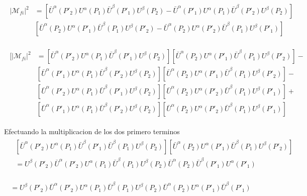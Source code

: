 \begin{gather}
\begin{split}
{|\mathcal{M}_{fi}|}^2&=[\bar{U}^{\alpha}({P'}_2){U}^{\alpha}({P}_1)\bar{U}^{\beta}({P'}_1){U}^{\beta}({P}_2)-\bar{U}^{\alpha}({P'}_1){U}^{\alpha}({P}_1)\bar{U}^{\beta}({P'}_2){U}^{\beta}({P}_2)]\\&[\bar{U}^{\alpha}({P}_2){U}^{\alpha}({P'}_1)\bar{U}^{\beta}({P}_1){U}^{\beta}({P'}_2)-\bar{U}^{\alpha}({P}_2){U}^{\alpha}({P'}_2)\bar{U}^{\beta}({P}_1){U}^{\beta}({P'}_1)]
\end{split}
\end{gather}

\begin{gather}
\begin{split}
[{|\mathcal{M}_{fi}|}^2&=[\bar{U}^{\alpha}({P'}_2){U}^{\alpha}({P}_1)\bar{U}^{\beta}({P'}_1){U}^{\beta}({P}_2)][\bar{U}^{\alpha}({P}_2){U}^{\alpha}({P'}_1)\bar{U}^{\beta}({P}_1){U}^{\beta}({P'}_2)]-\\&[\bar{U}^{\alpha}({P'}_1){U}^{\alpha}({P}_1)\bar{U}^{\beta}({P'}_2){U}^{\beta}({P}_2)][\bar{U}^{\alpha}({P}_2){U}^{\alpha}({P'}_1)\bar{U}^{\beta}({P}_1){U}^{\beta}({P'}_2)]-\\&[\bar{U}^{\alpha}({P'}_2){U}^{\alpha}({P}_1)\bar{U}^{\beta}({P'}_1){U}^{\beta}({P}_2)][\bar{U}^{\alpha}({P}_2){U}^{\alpha}({P'}_2)\bar{U}^{\beta}({P}_1){U}^{\beta}({P'}_1)]+\\&[\bar{U}^{\alpha}({P'}_1){U}^{\alpha}({P}_1)\bar{U}^{\beta}({P'}_2){U}^{\beta}({P}_2)][\bar{U}^{\alpha}({P}_2){U}^{\alpha}({P'}_2)\bar{U}^{\beta}({P}_1){U}^{\beta}({P'}_1)]
\end{split}
\end{gather}

Efectuando la multiplicacion de los dos primero terminos
\begin{gather}
\begin{split}
&[\bar{U}^{\alpha}({P'}_2){U}^{\alpha}({P}_1)\bar{U}^{\beta}({P'}_1)\bar{U}^{\beta}({P}_1){U}^{\beta}({P}_2)][\bar{U}^{\alpha}({P}_2){U}^{\alpha}({P'}_1)\bar{U}^{\beta}({P}_1){U}^{\beta}({P'}_2)]\\&={U}^{\beta}({P'}_2)\bar{U}^{\alpha}({P'}_2){U}^{\alpha}({P}_1)\bar{U}^{\beta}({P}_1){U}^{\beta}({P}_2)\bar{U}^{\alpha}({P}_2)\bar{U}^{\beta}({P'}_1){U}^{\alpha}({P'}_1)
\end{split}
\end{gather}

\begin{gather}
\begin{split}
={U}^{\beta}({P'}_2)\bar{U}^{\alpha}({P'}_2){U}^{\alpha}({P}_1)\bar{U}^{\beta}({P}_1){U}^{\beta}({P}_2)\bar{U}^{\alpha}({P}_2){U}^{\alpha}({P'}_1)\bar{U}^{\beta}({P'}_1)
\end{split}
\end{gather}

